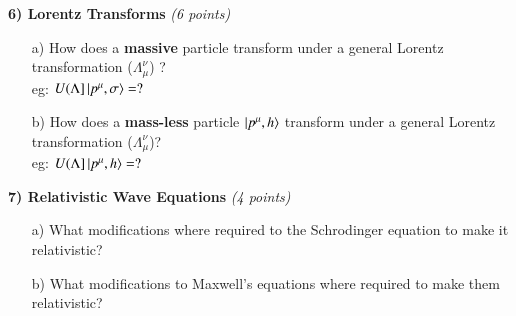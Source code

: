 {\textbf{6) Lorentz Transforms } \hfill \textit{(6 points)}\\
\begin{itemize}
\item[a)] How does a \textbf{massive} particle transform under a general Lorentz transformation ($\Lambda_\mu^\nu$) ?\\
eg:  $U(\Lambda] \ket{p^\mu,\sigma} = ?$ 
\vspace*{1in}

\item[b)] How does a \textbf{mass-less} particle $\ket{p^\mu,h}$ transform under a general Lorentz transformation ($\Lambda_\mu^\nu$)?\\
eg:  $U(\Lambda] \ket{p^\mu,h} = ?$ 
\vspace*{1in}
  
\end{itemize}



\textbf{7) Relativistic Wave Equations } \hfill \textit{(4 points)}\\

\begin{itemize}
\item[a)] What modifications where required to the Schrodinger equation to make it relativistic?
  \vspace*{1in}
\item[b)] What modifications to Maxwell's equations where required to make them relativistic?
  \vspace*{1in}
\end{itemize}

}
